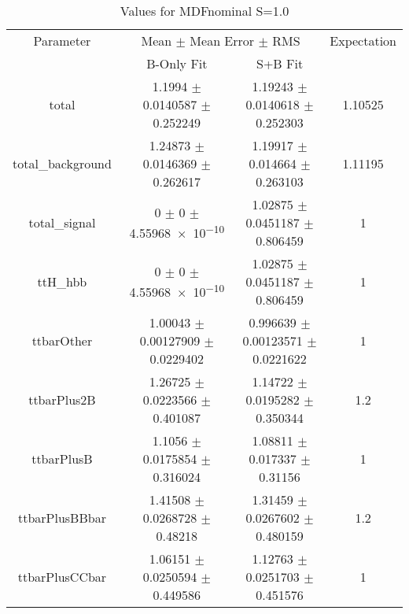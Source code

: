 \begin{table}
\centering
\caption{Values for MDFnominal S=1.0}
\begin{tabular}{cccc}
\toprule
Parameter & \multicolumn{2}{c}{Mean $\pm$ Mean Error $\pm$ RMS} & Expectation\\
 & B-Only Fit & S+B Fit & \\
\midrule
total & \num{1.1994} $\pm$ \num{0.0140587} $\pm$ \num{0.252249} & \num{1.19243} $\pm$ \num{0.0140618} $\pm$ \num{0.252303} & \num{1.10525}\\
total\_background & \num{1.24873} $\pm$ \num{0.0146369} $\pm$ \num{0.262617} & \num{1.19917} $\pm$ \num{0.014664} $\pm$ \num{0.263103} & \num{1.11195}\\
total\_signal & \num{0} $\pm$ \num{0} $\pm$ \num{4.55968e-10} & \num{1.02875} $\pm$ \num{0.0451187} $\pm$ \num{0.806459} & \num{1}\\
ttH\_hbb & \num{0} $\pm$ \num{0} $\pm$ \num{4.55968e-10} & \num{1.02875} $\pm$ \num{0.0451187} $\pm$ \num{0.806459} & \num{1}\\
ttbarOther & \num{1.00043} $\pm$ \num{0.00127909} $\pm$ \num{0.0229402} & \num{0.996639} $\pm$ \num{0.00123571} $\pm$ \num{0.0221622} & \num{1}\\
ttbarPlus2B & \num{1.26725} $\pm$ \num{0.0223566} $\pm$ \num{0.401087} & \num{1.14722} $\pm$ \num{0.0195282} $\pm$ \num{0.350344} & \num{1.2}\\
ttbarPlusB & \num{1.1056} $\pm$ \num{0.0175854} $\pm$ \num{0.316024} & \num{1.08811} $\pm$ \num{0.017337} $\pm$ \num{0.31156} & \num{1}\\
ttbarPlusBBbar & \num{1.41508} $\pm$ \num{0.0268728} $\pm$ \num{0.48218} & \num{1.31459} $\pm$ \num{0.0267602} $\pm$ \num{0.480159} & \num{1.2}\\
ttbarPlusCCbar & \num{1.06151} $\pm$ \num{0.0250594} $\pm$ \num{0.449586} & \num{1.12763} $\pm$ \num{0.0251703} $\pm$ \num{0.451576} & \num{1}\\
\bottomrule
\end{tabular}
\end{table}